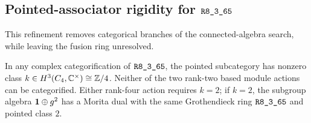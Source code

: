 \subsection{Pointed-associator rigidity for \texorpdfstring{$\sha{R8_3_65}$}{R8-3-65}}
\label{sec:r65-pointed-associator-next}
This refinement removes categorical branches of the connected-algebra
search, while leaving the fusion ring unresolved.

\begin{proposition}
In any complex categorification of $\sha{R8_3_65}$, the pointed subcategory
has nonzero class $k\in H^3(C_4,\mathbb C^\times)\cong\mathbb Z/4$.
Neither of the two rank-two based module actions can be categorified.
Either rank-four action requires $k=2$; if $k=2$, the subgroup algebra
$\mathbf1\oplus g^2$ has a Morita dual with the same Grothendieck ring
$\sha{R8_3_65}$ and pointed class $2$.
\end{proposition}
